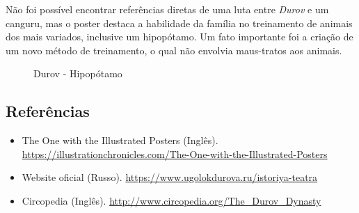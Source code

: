 Não foi possível encontrar referências diretas de uma luta entre
\emph{Durov} e um canguru, mas o poster destaca a habilidade da família
no treinamento de animais dos mais variados, inclusive um hipopótamo. Um
fato importante foi a criação de um novo método de treinamento, o qual
não envolvia maus-tratos aos animais.

\begin{figure}
  \centering
    \caption{Durov - Hipopótamo\label{fig:durov-hipop-tamo}}
\end{figure}

\hypertarget{referuxeancias-3}{%
\subsection{Referências}\label{referuxeancias-3}}

\begin{itemize}
\tightlist
\item
  \sloppy The One with the Illustrated Posters (Inglês). \url{https://illustrationchronicles.com/The-One-with-the-Illustrated-Posters}
\item
  \sloppy Website oficial (Russo). \url{https://www.ugolokdurova.ru/istoriya-teatra}
\item
  \sloppy Circopedia (Inglês). \url{http://www.circopedia.org/The_Durov_Dynasty}
\end{itemize}
